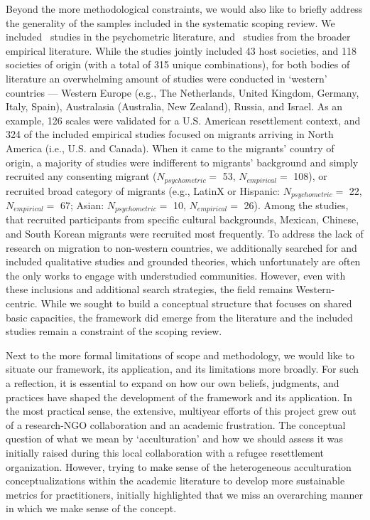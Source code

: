 \documentclass[man, 12pt, a4paper, mask]{apa7}
\begin{document}
Beyond the more methodological constraints, we would also like to briefly address the generality of the samples included in the systematic scoping review. We included \nMeth \, studies in the psychometric literature, and \nEmp \, studies from the broader empirical literature. While the studies jointly included 43 host societies, and 118 societies of origin (with a total of 315 unique combinations), for both bodies of literature an overwhelming amount of studies were conducted in `western' countries --- Western Europe (e.g., The Netherlands, United Kingdom, Germany, Italy, Spain), Australasia (Australia, New Zealand), Russia, and Israel. As an example, 126 scales were validated for a U.S. American resettlement context, and 324 of the included empirical studies focused on migrants arriving in North America (i.e., U.S. and Canada). When it came to the migrants' country of origin, a majority of studies were indifferent to migrants' background and simply recruited any consenting migrant ($N_{psychometric}=$ 53, $N_{empirical}=$ 108), or recruited broad category of migrants (e.g., LatinX or Hispanic: $N_{psychometric}=$ 22, $N_{empirical}=$ 67; Asian: $N_{psychometric}=$ 10, $N_{empirical}=$ 26). Among the studies, that recruited participants from specific cultural backgrounds, Mexican, Chinese, and South Korean migrants were recruited most frequently. To address the lack of research on migration to non-western countries, we additionally searched for and included qualitative studies and grounded theories, which unfortunately are often the only works to engage with understudied communities. However, even with these inclusions and additional search strategies, the field remains Western-centric. While we sought to build a conceptual structure that focuses on shared basic capacities, the framework did emerge from the literature and the included studies remain a constraint of the scoping review.

Next to the more formal limitations of scope and methodology, we would like to situate our framework, its application, and its limitations more broadly. For such a reflection, it is essential to expand on how our own beliefs, judgments, and practices have shaped the development of the framework and its application. In the most practical sense, the extensive, multiyear efforts of this project grew out of a research-NGO collaboration and an academic frustration. The conceptual question of what we mean by `acculturation' and how we should assess it was initially raised during this local collaboration with a refugee resettlement organization. However, trying to make sense of the heterogeneous acculturation conceptualizations within the academic literature to develop more sustainable metrics for practitioners, initially highlighted that we miss an overarching manner in which we make sense of the concept. 
\end{document}
